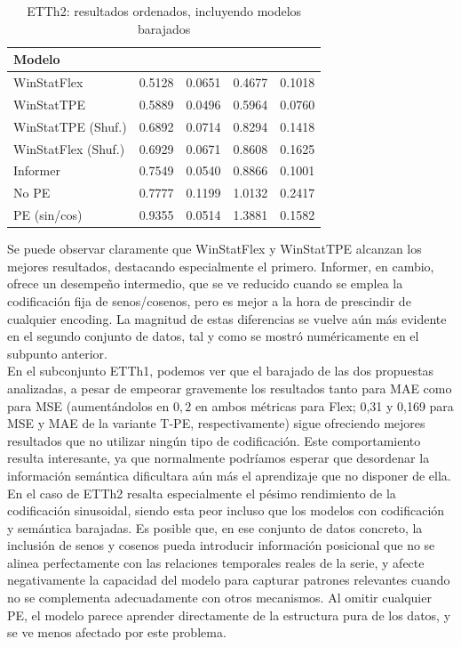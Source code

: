 \begin{table}[ht]
	\centering
	\begin{tabular}{l|N|N|N|N}
		\toprule
		Modelo &  &  &  &  \\
		\midrule
		WinStatFlex            & 0.5128 & 0.0651 & 0.4677 & 0.1018 \\
		WinStatTPE             & 0.5889 & 0.0496 & 0.5964 & 0.0760 \\
		WinStatTPE (Shuf.)     & 0.6892 & 0.0714 & 0.8294 & 0.1418 \\
		WinStatFlex (Shuf.)    & 0.6929 & 0.0671 & 0.8608 & 0.1625 \\
		Informer               & 0.7549 & 0.0540 & 0.8866 & 0.1001 \\
		No PE                  & 0.7777 & 0.1199 & 1.0132 & 0.2417 \\
		PE (sin/cos)           & 0.9355 & 0.0514 & 1.3881 & 0.1582 \\
		\bottomrule
	\end{tabular}
	\caption{ETTh2: resultados ordenados, incluyendo modelos barajados}
	\label{etth2fintab}
\end{table}




Se puede observar claramente que WinStatFlex y WinStatTPE alcanzan los mejores resultados, destacando especialmente el primero. Informer, en cambio, ofrece un desempeño intermedio, que se ve reducido cuando se emplea la codificación fija de senos/cosenos, pero es mejor a la hora de prescindir de cualquier encoding. La magnitud de estas diferencias se vuelve aún más evidente en el segundo conjunto de datos, tal y como se mostró numéricamente en el subpunto anterior.\\

En el subconjunto ETTh1, podemos ver que el barajado de las dos propuestas analizadas, a pesar de empeorar gravemente los resultados tanto para MAE como para MSE (aumentándolos en $0,2$ en ambos métricas para Flex; 0,31 y 0,169 para MSE y MAE de la variante T-PE, respectivamente) sigue ofreciendo mejores resultados que no utilizar ningún tipo de codificación. Este comportamiento resulta interesante, ya que normalmente podríamos esperar que desordenar la información semántica dificultara aún más el aprendizaje que no disponer de ella.\\

En el caso de ETTh2 resalta especialmente el pésimo rendimiento de la codificación sinusoidal, siendo esta peor incluso que los modelos con codificación y semántica barajadas. Es posible que, en ese conjunto de datos concreto, la inclusión de senos y cosenos pueda introducir información posicional que no se alinea perfectamente con las relaciones temporales reales de la serie, y afecte negativamente la capacidad del modelo para capturar patrones relevantes cuando no se complementa adecuadamente con otros mecanismos. Al omitir cualquier PE, el modelo parece aprender directamente de la estructura pura de los datos, y se ve menos afectado por este problema.\\

